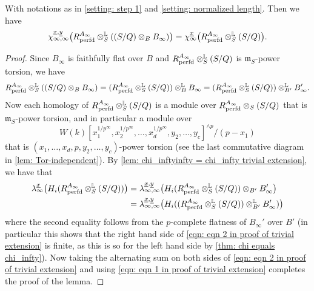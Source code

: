 \documentclass[12pt]{amsart}
\numberwithin{equation}{theorem}
\numberwithin{equation}{theorem}
\renewcommand{\m}{\mathfrak{m}}
\newcommand{\perfd}{\textnormal{perfd}}
\begin{document}
\begin{lemma}
\label{lem: trivial extension}
With notations as in \autoref{setting: step 1} and \autoref{setting: normalized length}. Then we have 
$$\chi_{\infty,\infty}^{\underline{x},\underline{y}}\big(R^{A_\infty}_\perfd \otimes^\myL_S((S/Q)\otimes_BB_\infty)\big)= \chi_\infty^{\underline{x}}\big(R^{A_\infty}_\perfd \otimes^\myL_S(S/Q)\big).$$
\end{lemma}
\begin{proof}
Since $B_\infty$ is faithfully flat over $B$ and $R^{A_\infty}_\perfd \otimes^\myL_S(S/Q)$ is $\m_S$-power torsion, we have 
\begin{equation}
\label{eqn: eqn 1 in proof of trivial extension}
R^{A_\infty}_\perfd \otimes^\myL_S((S/Q)\otimes_BB_\infty) = (R^{A_\infty}_\perfd \otimes^\myL_S(S/Q))\otimes^\myL_BB_\infty = (R^{A_\infty}_\perfd \otimes^\myL_S(S/Q))\otimes^\myL_{B'}B'_\infty.
\end{equation}
Now each homology of $R^{A_\infty}_\perfd \otimes^\myL_S(S/Q)$ is a module over $R^{A_\infty}_\perfd \otimes_S(S/Q)$ that is $\m_S$-power torsion, and in particular a module over 
$$W(k)[x_1^{1/p^\infty},x_2^{1/p^\infty}, \dots,x_d^{1/p^\infty},y_2,\dots,y_c]^{\wedge p}/(p-x_1)$$ that is $(x_1,\dots,x_d, p, y_2,\dots,y_c)$-power torsion (see the last commutative diagram in \autoref{lem: Tor-independent}). By \autoref{lem: chi_inftyinfty = chi_infty trivial extension}, we have that 
\begin{align}
\label{eqn: eqn 2 in proof of trivial extension}
\lambda_\infty^{\underline{x}}\big(H_i(R^{A_\infty}_\perfd \otimes^\myL_S(S/Q))\big) & = \lambda_{\infty,\infty}^{\underline{x},\underline{y}}\big(H_i(R^{A_\infty}_\perfd \otimes^\myL_S(S/Q))\otimes_{B'}B'_\infty\big) \\
& = \lambda_{\infty,\infty}^{\underline{x},\underline{y}}\big(H_i((R^{A_\infty}_\perfd \otimes^\myL_S(S/Q))\otimes^\myL_{B'}B'_\infty)\big)    \notag
\end{align}
where the second equality follows from the $p$-complete flatness of $B_\infty'$ over $B'$ (in particular this shows that the right hand side of \autoref{eqn: eqn 2 in proof of trivial extension} is finite, as this is so for the left hand side by \autoref{thm: chi equals chi_infty}). Now taking the alternating sum on both sides of \autoref{eqn: eqn 2 in proof of trivial extension} and using \autoref{eqn: eqn 1 in proof of trivial extension} completes the proof of the lemma.
\end{proof}
\end{document}
